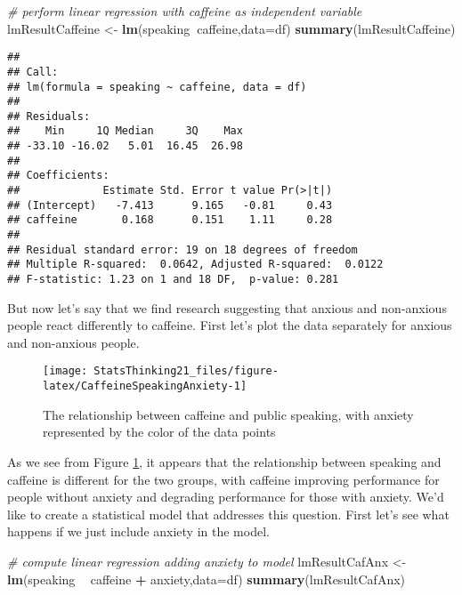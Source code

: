 \documentclass[]{book}
\newenvironment{Shaded}{\begin{snugshade}}{\end{snugshade}}
\newcommand{\KeywordTok}[1]{\textcolor[rgb]{0.13,0.29,0.53}{\textbf{#1}}}
\newcommand{\DataTypeTok}[1]{\textcolor[rgb]{0.13,0.29,0.53}{#1}}
\newcommand{\StringTok}[1]{\textcolor[rgb]{0.31,0.60,0.02}{#1}}
\newcommand{\CommentTok}[1]{\textcolor[rgb]{0.56,0.35,0.01}{\textit{#1}}}
\newcommand{\OperatorTok}[1]{\textcolor[rgb]{0.81,0.36,0.00}{\textbf{#1}}}
\newcommand{\NormalTok}[1]{#1}
\theoremstyle{definition}
\theoremstyle{definition}
\theoremstyle{definition}
\theoremstyle{remark}
\begin{document}
\begin{Shaded}
\begin{Highlighting}[]
\CommentTok{# perform linear regression with caffeine as independent variable}
\NormalTok{lmResultCaffeine <-}\StringTok{ }\KeywordTok{lm}\NormalTok{(speaking}\OperatorTok{~}\NormalTok{caffeine,}\DataTypeTok{data=}\NormalTok{df)}
\KeywordTok{summary}\NormalTok{(lmResultCaffeine)}
\end{Highlighting}
\end{Shaded}

\begin{verbatim}
## 
## Call:
## lm(formula = speaking ~ caffeine, data = df)
## 
## Residuals:
##    Min     1Q Median     3Q    Max 
## -33.10 -16.02   5.01  16.45  26.98 
## 
## Coefficients:
##             Estimate Std. Error t value Pr(>|t|)
## (Intercept)   -7.413      9.165   -0.81     0.43
## caffeine       0.168      0.151    1.11     0.28
## 
## Residual standard error: 19 on 18 degrees of freedom
## Multiple R-squared:  0.0642, Adjusted R-squared:  0.0122 
## F-statistic: 1.23 on 1 and 18 DF,  p-value: 0.281
\end{verbatim}

But now let's say that we find research suggesting that anxious and
non-anxious people react differently to caffeine. First let's plot the
data separately for anxious and non-anxious people.

\begin{figure}
\texttt{[image: StatsThinking21\_files/figure-latex/CaffeineSpeakingAnxiety-1]} \caption{The relationship between caffeine and public speaking, with anxiety represented by the color of the data points}\label{fig:CaffeineSpeakingAnxiety}
\end{figure}

As we see from Figure \ref{fig:CaffeineSpeakingAnxiety}, it appears that
the relationship between speaking and caffeine is different for the two
groups, with caffeine improving performance for people without anxiety
and degrading performance for those with anxiety. We'd like to create a
statistical model that addresses this question. First let's see what
happens if we just include anxiety in the model.

\begin{Shaded}
\begin{Highlighting}[]
\CommentTok{# compute linear regression adding anxiety to model}
\NormalTok{lmResultCafAnx <-}\StringTok{ }\KeywordTok{lm}\NormalTok{(speaking }\OperatorTok{~}\StringTok{ }\NormalTok{caffeine }\OperatorTok{+}\StringTok{ }\NormalTok{anxiety,}\DataTypeTok{data=}\NormalTok{df)}
\KeywordTok{summary}\NormalTok{(lmResultCafAnx)}
\end{Highlighting}
\end{Shaded}
\end{document}
